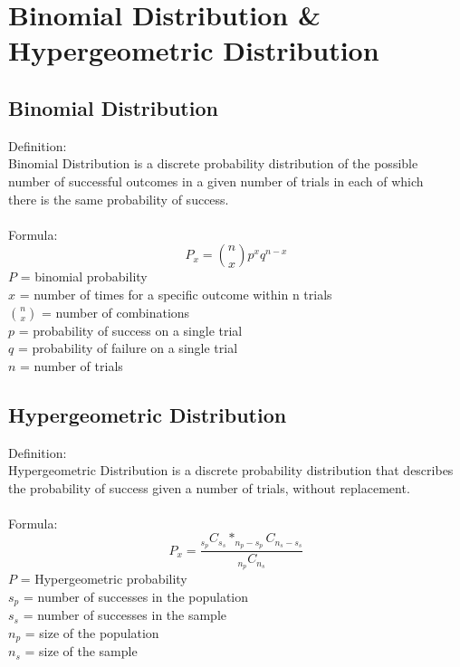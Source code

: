 \documentclass[letterpaper, 10pt]{article}
\begin{document}
\section{Binomial Distribution \& \\Hypergeometric Distribution}
\noindent
\subsection{Binomial Distribution}
Definition:\\
Binomial Distribution is a discrete probability distribution of the possible\\ number of successful outcomes in a given number of trials in each of which \\
there is the same probability of success.\\
\\
Formula: \\
\[P_{x} = {n \choose x} p^{x} q^{n-x}\]
$P$	=	binomial probability\\
$x$	=	number of times for a specific outcome within n trials\\
${n \choose x}$	=	number of combinations\\
$p$	=	probability of success on a single trial\\
$q$	=	probability of failure on a single trial\\
$n$	=	number of trials\\

\subsection{Hypergeometric Distribution}
Definition: \\
Hypergeometric Distribution is a discrete probability distribution that describes \\
the probability of success given a number of trials, without replacement.\\\
\\
Formula: \\
\[P_{x} = \frac{ _{s_{p}}C_{s_{s}}* _{n_{p}-s_{p}}C_{n_{s}-s_{s}}}{_{n_{p}}C_{n_{s}}}\]
$P$	=	Hypergeometric probability\\
$s_{p}$	= number of successes in the population\\
$s_{s}$	= number of successes in the sample\\
$n_{p}$	= size of the population\\
$n_{s}$	= size of the sample\\
\end{document}
